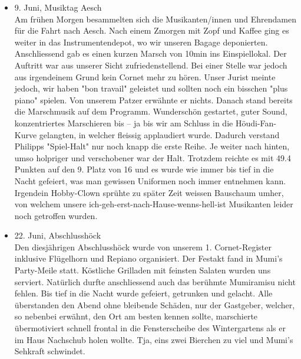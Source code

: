 \begin{history}
\begin{itemize}
        \item[]9. Juni, Musiktag Aesch\\
        Am frühen Morgen besammelten sich die Musikanten/innen und Ehrendamen
        für die Fahrt nach Aesch. Nach einem Zmorgen mit Zopf und Kaffee ging es
        weiter in das Instrumentendepot, wo wir unseren Bagage deponierten.
        Anschliessend gab es einen kurzen Marsch von 10min ins Einspiellokal.
        Der Auftritt war aus unserer Sicht zufriedenstellend. Bei einer Stelle
        war jedoch aus irgendeinem Grund kein Cornet mehr zu hören. Unser Jurist
        meinte jedoch, wir haben "bon travail" geleistet und sollten noch ein
        bisschen "plus piano" spielen. Von unserem Patzer erwähnte er nichts.
        Danach stand bereits die Marschmusik auf dem Programm. Wunderschön
        gestartet, guter Sound, konzentriertes Marschieren bis -- ja bis wir am
        Schluss in die Höudi-Fan-Kurve gelangten, in welcher fleissig
        applaudiert wurde. Dadurch verstand Philipps "Spiel-Halt" nur noch knapp
        die erste Reihe. Je weiter nach hinten, umso holpriger und verschobener
        war der Halt. Trotzdem reichte es mit 49.4 Punkten auf den 9. Platz von
        16 und es wurde wie immer bis tief in die Nacht gefeiert, was man
        gewissen Uniformen noch immer entnehmen kann. Irgendein Hobby-Clown
        sprühte zu später Zeit weissen Bauschaum umher, von welchem unsere
        ich-geh-erst-nach-Hause-wenns-hell-ist Musikanten leider noch getroffen
        wurden.

        \item[]22. Juni, Abschlusshöck\\
        Den diesjährigen Abschlusshöck wurde von unserem 1. Cornet-Register
        inklusive Flügelhorn und Repiano organisiert. Der Festakt fand in Mumi's
        Party-Meile statt. Köstliche Grilladen mit feinsten Salaten wurden uns
        serviert. Natürlich durfte anschliessend auch das berühmte Mumiramisu
        nicht fehlen. Bis tief in die Nacht wurde gefeiert, getrunken und
        gelacht. Alle überstanden den Abend ohne bleibende Schäden, nur der
        Gastgeber, welcher, so nebenbei erwähnt, den Ort am besten kennen
        sollte, marschierte übermotiviert schnell frontal in die Fensterscheibe
        des Wintergartens als er im Haus Nachschub holen wollte. Tja, eins zwei
        Bierchen zu viel und Mumi's Sehkraft schwindet.


\end{itemize}
\end{history}
